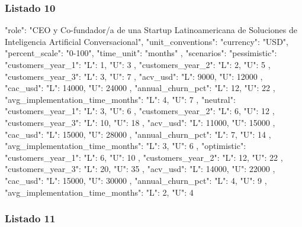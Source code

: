 \subsubsection{Listado 10}
\label{anexo:code-6-3-2-10}

\begin{APACode}
{
  "role": "CEO y Co-fundador/a de una Startup Latinoamericana de Soluciones de Inteligencia Artificial Conversacional",
  "unit_conventions": {
    "currency": "USD",
    "percent_scale": "0-100",
    "time_unit": "months"
  },
  "scenarios": {
    "pessimistic": {
      "customers_year_1": {
        "L": 1,
        "U": 3
      },
      "customers_year_2": {
        "L": 2,
        "U": 5
      },
      "customers_year_3": {
        "L": 3,
        "U": 7
      },
      "acv_usd": {
        "L": 9000,
        "U": 12000
      },
      "cac_usd": {
        "L": 14000,
        "U": 24000
      },
      "annual_churn_pct": {
        "L": 12,
        "U": 22
      },
      "avg_implementation_time_months": {
        "L": 4,
        "U": 7
      }
    },
    "neutral": {
      "customers_year_1": {
        "L": 3,
        "U": 6
      },
      "customers_year_2": {
        "L": 6,
        "U": 12
      },
      "customers_year_3": {
        "L": 10,
        "U": 18
      },
      "acv_usd": {
        "L": 11000,
        "U": 15000
      },
      "cac_usd": {
        "L": 15000,
        "U": 28000
      },
      "annual_churn_pct": {
        "L": 7,
        "U": 14
      },
      "avg_implementation_time_months": {
        "L": 3,
        "U": 6
      }
    },
    "optimistic": {
      "customers_year_1": {
        "L": 6,
        "U": 10
      },
      "customers_year_2": {
        "L": 12,
        "U": 22
      },
      "customers_year_3": {
        "L": 20,
        "U": 35
      },
      "acv_usd": {
        "L": 14000,
        "U": 22000
      },
      "cac_usd": {
        "L": 15000,
        "U": 30000
      },
      "annual_churn_pct": {
        "L": 4,
        "U": 9
      },
      "avg_implementation_time_months": {
        "L": 2,
        "U": 4
      }
    }
  }
}
\end{APACode}

\subsubsection{Listado 11}
\label{anexo:code-6-3-2-11}

